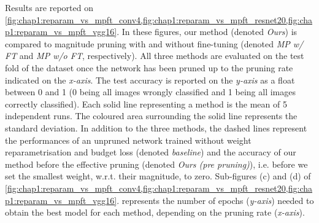 Results are reported on
\cref{fig:chap1:reparam_vs_mpft_conv4,fig:chap1:reparam_vs_mpft_resnet20,fig:chap1:reparam_vs_mpft_vgg16}.
In these figures, our method (denoted \emph{Ours}) is compared to magnitude
pruning with and without fine-tuning (denoted \emph{MP w/ FT} and \emph{MP w/o
FT}, respectively). All three methods are evaluated on the test fold of the
dataset once the network has been pruned up to the pruning rate indicated on the
\emph{x-axis}. The test accuracy is reported on the \emph{y-axis} as a float
between 0 and 1 (0 being all images wrongly classified and 1 being all images
correctly classified). Each solid line representing a method is the mean of 5
independent runs. The coloured area surrounding the solid line represents the
standard deviation. In addition to the three methods, the dashed lines represent
the performances of an unpruned network trained without weight reparametrisation
and budget loss (denoted \emph{baseline}) and the accuracy of our method before
the effective pruning (denoted \emph{Ours (pre pruning)}), i.e. before we set
the smallest weight, w.r.t. their magnitude, to zero. Sub-figures (c) and (d) of
\cref{fig:chap1:reparam_vs_mpft_conv4,fig:chap1:reparam_vs_mpft_resnet20,fig:chap1:reparam_vs_mpft_vgg16}.
represents the number of epochs (\emph{y-axis}) needed to obtain the best model
for each method, depending on the pruning rate (\emph{x-axis}).\\


